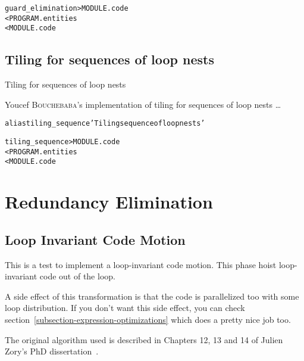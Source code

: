 \documentclass[a4paper]{report}
\newenvironment{PipsMake}{\begin{alltt}}{\end{alltt}}
\newenvironment{PipsPass}[1]{\label{pass:#1}}{}
\begin{document}
\begin{PipsMake}
guard_elimination       > MODULE.code
        < PROGRAM.entities
        < MODULE.code
\end{PipsMake}


\subsection{Tiling for sequences of loop nests}
\label{subsection-tiling-for-sequences-loop-ness}

\begin{PipsPass}{tiling_sequence}
Tiling for sequences of loop nests
\end{PipsPass}

Youcef \textsc{Bouchebaba}'s implementation of tiling for sequences of
loop nests \ldots

\begin{PipsMake}
alias tiling_sequence 'Tiling sequence of loop nests'
\end{PipsMake}

\begin{PipsMake}
tiling_sequence      > MODULE.code
        < PROGRAM.entities
        < MODULE.code
\end{PipsMake}




\section{Redundancy Elimination}

\subsection{Loop Invariant Code Motion}
\label{subsection-invariant_code_motion}

\begin{PipsPass}{invariant_code_motion}
This is a test to implement a loop-invariant code motion. This phase hoist
loop-invariant code out of the loop.

A side effect of this transformation is that the code is parallelized too
with some loop distribution. If you don't want this side effect, you can
check section~\ref{subsection-expression-optimizations} which does a
pretty nice job too.

The original algorithm used is described in Chapters 12, 13 and 14 of
Julien Zory's PhD dissertation~\cite{Zor99}.
\end{PipsPass}
\end{document}
